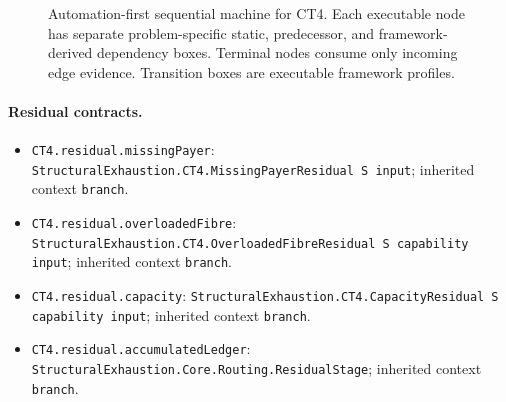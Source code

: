 \begin{landscape}
\begin{figure}[p]
\begin{adjustbox}{max totalsize={\linewidth}{0.72\textheight},center}
%
\end{adjustbox}
\caption{Automation-first sequential machine for CT4. Each executable node has separate problem-specific static, predecessor, and framework-derived dependency boxes. Terminal nodes consume only incoming edge evidence. Transition boxes are executable framework profiles.}
\label{fig:ct4-machine}
\end{figure}
\end{landscape}

\begingroup\small\sloppy
\paragraph{Residual contracts.}
\begin{itemize}
\item \texttt{CT4.\allowbreak{}residual.\allowbreak{}missing\allowbreak{}Payer}: \texttt{Structural\allowbreak{}Exhaustion.\allowbreak{}CT4.\allowbreak{}Missing\allowbreak{}Payer\allowbreak{}Residual S input}; inherited context \texttt{branch}.
\item \texttt{CT4.\allowbreak{}residual.\allowbreak{}overloaded\allowbreak{}Fibre}: \texttt{Structural\allowbreak{}Exhaustion.\allowbreak{}CT4.\allowbreak{}Overloaded\allowbreak{}Fibre\allowbreak{}Residual S capability input}; inherited context \texttt{branch}.
\item \texttt{CT4.\allowbreak{}residual.\allowbreak{}capacity}: \texttt{Structural\allowbreak{}Exhaustion.\allowbreak{}CT4.\allowbreak{}Capacity\allowbreak{}Residual S capability input}; inherited context \texttt{branch}.
\item \texttt{CT4.\allowbreak{}residual.\allowbreak{}accumulated\allowbreak{}Ledger}: \texttt{Structural\allowbreak{}Exhaustion.\allowbreak{}Core.\allowbreak{}Routing.\allowbreak{}Residual\allowbreak{}Stage}; inherited context \texttt{branch}.
\end{itemize}
\endgroup
